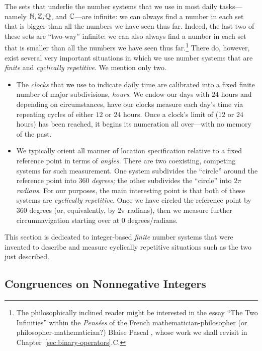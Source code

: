 The sets that underlie the number systems that we use in most daily
tasks---namely $\mathbb{N}, \mathbb{Z}, \mathbb{Q}$, and $\mathbb{C}$---are infinite: we can always
find a number in each set that is bigger than all the numbers we have
seen thus far.  Indeed, the last two of these sets are ``two-way''
infinite: we can also always find a number in each set that is smaller
than all the numbers we have seen thus
far.\footnote{\label{foot:Pascal}The philosophically inclined reader
might be interested in the essay ``The Two Infinities'' within the
{\it Pens\'{e}es} of the French mathematician-philosopher (or
philosopher-mathematician?) Blaise Pascal ,
whose work we shall revisit in Chapter~\ref{sec:binary-operators}.C.}
There do, however, exist several very important situations in which we
use number systems that are {\em finite} and {\em cyclically
  repetitive}.  We mention only two.
\begin{itemize}
\item
The {\em clocks} that we use to indicate daily time are calibrated
into a fixed finite number of major subdivisions, {\em hours}.  We
endow our days with $24$ hours and depending on circumstances, have
our clocks measure each day's time via repeating cycles of either $12$
or $24$ hours.  Once a clock's limit of ($12$ or $24$ hours) has been
reached, it begins its numeration all over---with no memory of the
past.

\item
We typically orient all manner of location specification relative to a
fixed reference point in terms of {\em angles}.  There are two
coexisting, competing systems for such measurement.  One system
subdivides the ``circle'' around the reference point into $360$ {\em
  degrees;} the other subdivides the ``circle'' into $2 \pi$ {\em
  radians}.  For our purposes, the main interesting point is that both
of these systems are {\em cyclically repetitive}.  Once we have
circled the reference point by $360$ degrees (or, equivalently, by $2
\pi$ radians), then we measure further circumnavigation starting over
at $0$ degrees/radians.
\end{itemize}

This section is dedicated to integer-based {\em finite} number systems
that were invented to describe and measure cyclically repetitive
situations such as the two just described.


\subsection{Congruences on Nonnegative Integers}
\label{sec:congruences}

